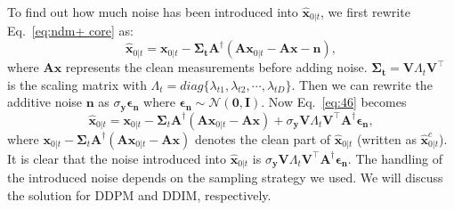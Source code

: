 \documentclass{article} \usepackage{iclr2023_conference,times}
\begin{document}
To find out how much noise has been introduced into $\mathbf{\hat{x}}_{0|t}$, we first rewrite Eq.~\ref{eq:ndm+ core} as:
\begin{equation}
    \mathbf{\hat{x}}_{0|t} =\mathbf{x}_{0|t} - \mathbf{\Sigma_t}\mathbf{A}^{\dagger}(\mathbf{A}\mathbf{x}_{0|t}-\mathbf{A}\mathbf{x}-\mathbf{n}),
    \label{eq:46}
\end{equation}
where $\mathbf{A}\mathbf{x}$ represents the clean measurements before adding noise. $\mathbf{\Sigma_t}=\mathbf{V}\Lambda_{t}\mathbf{V}^{\top}$ is the scaling matrix with $\Lambda_{t}=diag\{\lambda_{t1}, \lambda_{t2}, \cdots, \lambda_{tD}\}$. Then we can rewrite the additive noise $\mathbf{n}$ as $\sigma_{\mathbf{y}}\boldsymbol{\epsilon}_{\mathbf{n}}$ where $\boldsymbol{\epsilon}_{\mathbf{n}}\sim\mathcal{N}(\mathbf{0}, \mathbf{I})$. Now Eq.~\ref{eq:46} becomes
\begin{equation}
    \mathbf{\hat{x}}_{0|t} =\mathbf{x}_{0|t} - \mathbf{\Sigma}_t\mathbf{A}^{\dagger}(\mathbf{A}\mathbf{x}_{0|t}-\mathbf{A}\mathbf{x}) + \sigma_{\mathbf{y}}\mathbf{V}\Lambda_{t}\mathbf{V}^{\top}\mathbf{A}^{\dagger}\boldsymbol{\epsilon}_{\mathbf{n}},
    \label{eq:47}
\end{equation}
where $\mathbf{x}_{0|t} - \mathbf{\Sigma}_t\mathbf{A}^{\dagger}(\mathbf{A}\mathbf{x}_{0|t}-\mathbf{A}\mathbf{x})$ denotes the clean part of $\mathbf{\hat{x}}_{0|t}$ (written as $\mathbf{\hat{x}}_{0|t}^c$).
It is clear that the noise introduced into $\mathbf{\hat{x}}_{0|t}$ is $\sigma_{\mathbf{y}}\mathbf{V}\Lambda_{t}\mathbf{V}^{\top}\mathbf{A}^{\dagger}\boldsymbol{\epsilon}_{\mathbf{n}}$. The handling of the introduced noise depends on the sampling strategy we used. We will discuss the solution for DDPM and DDIM, respectively. 
\end{document}
